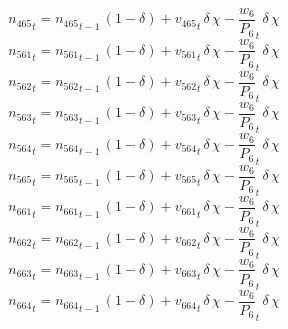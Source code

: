 \begin{dmath}
{{n_{465}}}_{t}={{n_{465}}}_{t-1}\, \left(1-{{\delta}}\right)+{{v_{465}}}_{t}\, {{\delta}}\, {{\chi}}-{{\frac{w_{6}}{P_{6}}}}_{t}\, {{\delta}}\, {{\chi}}
\end{dmath}
\begin{dmath}
{{n_{561}}}_{t}={{n_{561}}}_{t-1}\, \left(1-{{\delta}}\right)+{{v_{561}}}_{t}\, {{\delta}}\, {{\chi}}-{{\frac{w_{6}}{P_{6}}}}_{t}\, {{\delta}}\, {{\chi}}
\end{dmath}
\begin{dmath}
{{n_{562}}}_{t}={{n_{562}}}_{t-1}\, \left(1-{{\delta}}\right)+{{v_{562}}}_{t}\, {{\delta}}\, {{\chi}}-{{\frac{w_{6}}{P_{6}}}}_{t}\, {{\delta}}\, {{\chi}}
\end{dmath}
\begin{dmath}
{{n_{563}}}_{t}={{n_{563}}}_{t-1}\, \left(1-{{\delta}}\right)+{{v_{563}}}_{t}\, {{\delta}}\, {{\chi}}-{{\frac{w_{6}}{P_{6}}}}_{t}\, {{\delta}}\, {{\chi}}
\end{dmath}
\begin{dmath}
{{n_{564}}}_{t}={{n_{564}}}_{t-1}\, \left(1-{{\delta}}\right)+{{v_{564}}}_{t}\, {{\delta}}\, {{\chi}}-{{\frac{w_{6}}{P_{6}}}}_{t}\, {{\delta}}\, {{\chi}}
\end{dmath}
\begin{dmath}
{{n_{565}}}_{t}={{n_{565}}}_{t-1}\, \left(1-{{\delta}}\right)+{{v_{565}}}_{t}\, {{\delta}}\, {{\chi}}-{{\frac{w_{6}}{P_{6}}}}_{t}\, {{\delta}}\, {{\chi}}
\end{dmath}
\begin{dmath}
{{n_{661}}}_{t}={{n_{661}}}_{t-1}\, \left(1-{{\delta}}\right)+{{v_{661}}}_{t}\, {{\delta}}\, {{\chi}}-{{\frac{w_{6}}{P_{6}}}}_{t}\, {{\delta}}\, {{\chi}}
\end{dmath}
\begin{dmath}
{{n_{662}}}_{t}={{n_{662}}}_{t-1}\, \left(1-{{\delta}}\right)+{{v_{662}}}_{t}\, {{\delta}}\, {{\chi}}-{{\frac{w_{6}}{P_{6}}}}_{t}\, {{\delta}}\, {{\chi}}
\end{dmath}
\begin{dmath}
{{n_{663}}}_{t}={{n_{663}}}_{t-1}\, \left(1-{{\delta}}\right)+{{v_{663}}}_{t}\, {{\delta}}\, {{\chi}}-{{\frac{w_{6}}{P_{6}}}}_{t}\, {{\delta}}\, {{\chi}}
\end{dmath}
\begin{dmath}
{{n_{664}}}_{t}={{n_{664}}}_{t-1}\, \left(1-{{\delta}}\right)+{{v_{664}}}_{t}\, {{\delta}}\, {{\chi}}-{{\frac{w_{6}}{P_{6}}}}_{t}\, {{\delta}}\, {{\chi}}
\end{dmath}
